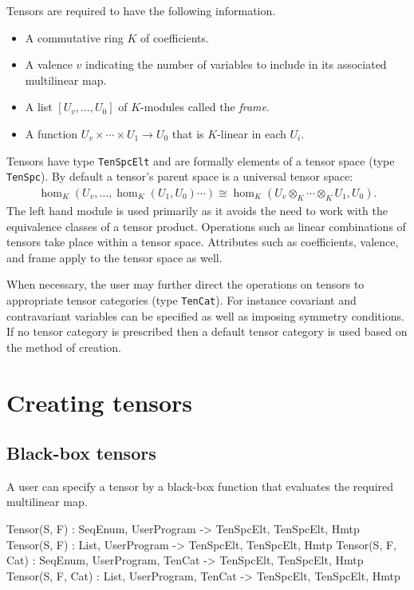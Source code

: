 
Tensors are required to have the following information.
\begin{itemize}
\item A commutative ring $K$ of coefficients.
\item A valence $v$ indicating the number of variables to include in its 
associated multilinear map.
\item A list $[U_v,\dots, U_0]$ of $K$-modules called the {\em frame}.
\item A function $U_v\times \cdots \times U_1\to U_0$ that is $K$-linear in 
each $U_i$.
\end{itemize}
Tensors have type {\tt TenSpcElt} and are formally elements of a tensor space 
(type {\tt TenSpc}).  By default a tensor's parent space is a universal tensor space:
\begin{align*}
	\hom_K(U_v,\dots,\hom_K(U_1,U_0)\cdots) \cong \hom_K(U_v\otimes_K\cdots \otimes_K U_1,U_0).
\end{align*}
The left hand module is used primarily as it avoids the need to work with 
the equivalence classes of a tensor product.
Operations such as linear combinations of tensors take place within a  
tensor space.
Attributes such as coefficients, valence, and frame  apply to the tensor space 
as well.

When necessary, the user may further direct the operations on tensors to 
appropriate tensor categories 
(type {\tt TenCat}).  For instance covariant and contravariant variables can 
be specified
as well as imposing symmetry conditions.  If no tensor category is prescribed
then a default tensor category is used based on the method of creation.
\medskip

\minitoc

\section{Creating tensors}

\subsection{Black-box tensors}
A user can specify a tensor by a black-box function that evaluates the required
multilinear map.

\begin{intrinsics}
Tensor(S, F) : SeqEnum, UserProgram -> TenSpcElt, TenSpcElt, Hmtp
Tensor(S, F) : List, UserProgram -> TenSpcElt, TenSpcElt, Hmtp
Tensor(S, F, Cat) : SeqEnum, UserProgram, TenCat -> TenSpcElt, TenSpcElt, Hmtp
Tensor(S, F, Cat) : List, UserProgram, TenCat -> TenSpcElt, TenSpcElt, Hmtp
\end{intrinsics}

